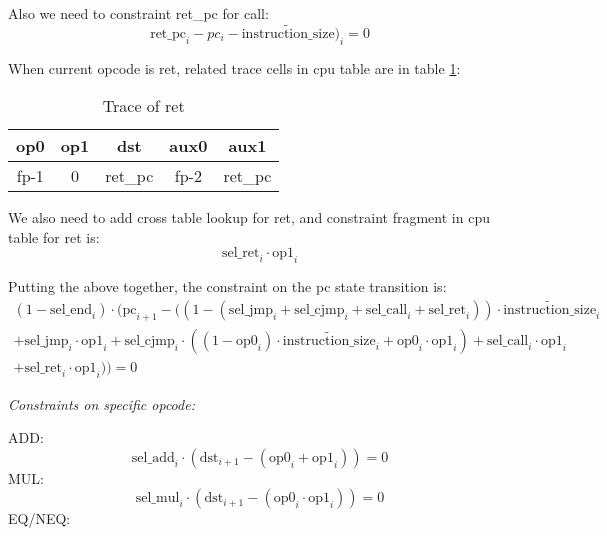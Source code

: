 Also we need to constraint ret\_pc for call:
\[ \mathrm{ret\_pc}_i - pc_i - \widetilde{\mathrm{instruction\_size}})_i = 0 \]

When current opcode is ret, related trace cells in cpu table are in table \ref{table:constraint-ret}:

\begin{table}[!ht]
    \centering
    \begin{tabular}{|c|c|c|c|c|}
        \hline
        \rowcolor{gray} op0       & op1 & dst                          & aux0                     & aux1                        \\
        \hline
        \cellcolor{green!20} fp-1 & 0   & \cellcolor{green!20} ret\_pc & \cellcolor{blue!20} fp-2 & \cellcolor{blue!20} ret\_pc \\
        \hline
    \end{tabular}
    \caption{Trace of ret}
    \label{table:constraint-ret}
\end{table}

We also need to add cross table lookup for ret, and constraint fragment in cpu table for ret is:
\[ \mathrm{sel\_ret}_i \cdot \mathrm{op1}_i \]

Putting the above together, the constraint on the pc state transition is:
\begin{multline*}
    (1-\mathrm{sel\_end}_i) \cdot (\mathrm{pc}_{i+1}-((1-(\mathrm{sel\_jmp}_i + \mathrm{sel\_cjmp}_i + \mathrm{sel\_call}_i + \mathrm{sel\_ret}_i)) \cdot \widetilde{\mathrm{instruction\_size}}_i \\
    + \mathrm{sel\_jmp}_i \cdot \mathrm{op1}_i + \mathrm{sel\_cjmp}_i \cdot ((1-\mathrm{op0}_i) \cdot \widetilde{\mathrm{instruction\_size}}_i + \mathrm{op0}_i \cdot \mathrm{op1}_i) + \mathrm{sel\_call}_i \cdot \mathrm{op1}_i \\
    + \mathrm{sel\_ret}_i \cdot \mathrm{op1}_i)) = 0
\end{multline*}

\emph{Constraints on specific opcode:}

ADD:
\[ \mathrm{sel\_add}_i \cdot (\mathrm{dst}_{i+1} - (\mathrm{op0}_i + \mathrm{op1}_i))=0 \]
MUL:
\[ \mathrm{sel\_mul}_i \cdot (\mathrm{dst}_{i+1} - (\mathrm{op0}_i \cdot \mathrm{op1}_i))=0 \]
EQ/NEQ:

